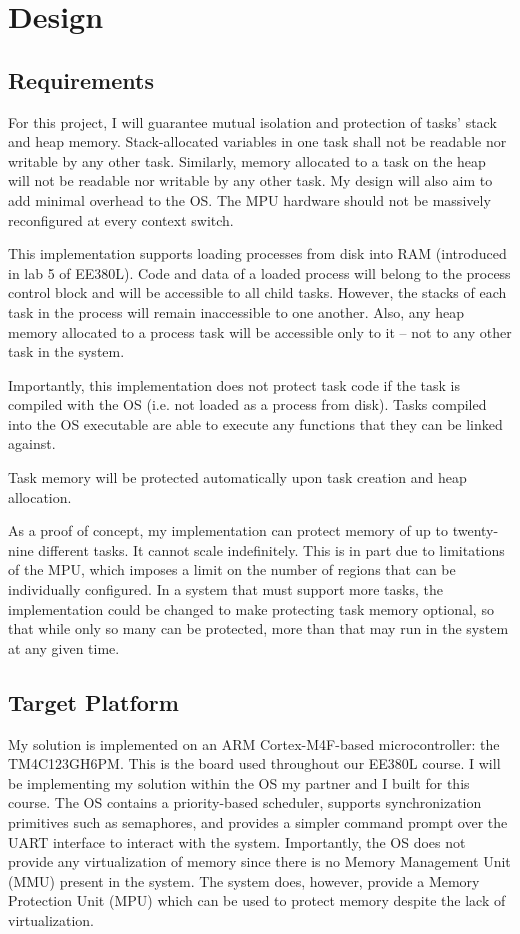 \chapter{Design}

\section{Requirements}

For this project, I will guarantee mutual isolation and protection of tasks' stack and heap memory. Stack-allocated variables in one task shall not be readable nor writable by any other task. Similarly, memory allocated to a task on the heap will not be readable nor writable by any other task. My design will also aim to add minimal overhead to the OS. The MPU hardware should not be massively reconfigured at every context switch.

This implementation supports loading processes from disk into RAM (introduced in lab 5 of EE380L). Code and data of a loaded process will belong to the process control block and will be accessible to all child tasks. However, the stacks of each task in the process will remain inaccessible to one another. Also, any heap memory allocated to a process task will be accessible only to it -- not to any other task in the system.

Importantly, this implementation does not protect task code if the task is compiled with the OS (i.e. not loaded as a process from disk). Tasks compiled into the OS executable are able to execute any functions that they can be linked against.

Task memory will be protected automatically upon task creation and heap allocation.

As a proof of concept, my implementation can protect memory of up to twenty-nine different tasks. It cannot scale indefinitely. This is in part due to limitations of the MPU, which imposes a limit on the number of regions that can be individually configured. In a system that must support more tasks, the implementation could be changed to make protecting task memory optional, so that while only so many can be protected, more than that may run in the system at any given time.

\section{Target Platform}

My solution is implemented on an ARM Cortex-M4F-based microcontroller: the TM4C123GH6PM. This is the board used throughout our EE380L course. I will be implementing my solution within the OS my partner and I built for this course. The OS contains a priority-based scheduler, supports synchronization primitives such as semaphores, and provides a simpler command prompt over the UART interface to interact with the system. Importantly, the OS does not provide any virtualization of memory since there is no Memory Management Unit (MMU) present in the system. The system does, however, provide a Memory Protection Unit (MPU) which can be used to protect memory despite the lack of virtualization.

